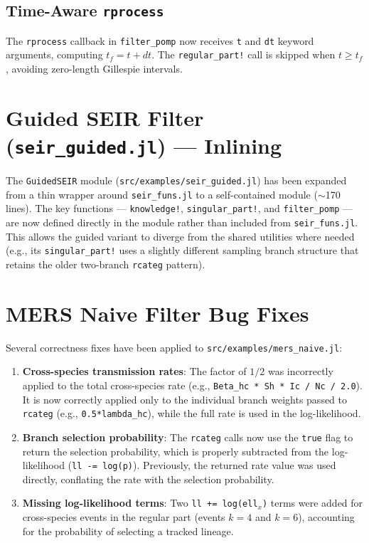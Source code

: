 \documentclass[11pt,letterpaper]{article}
\begin{document}
\subsection{Time-Aware \texttt{rprocess}}

The \texttt{rprocess} callback in \texttt{filter\_pomp} now receives
\texttt{t} and \texttt{dt} keyword arguments, computing
$t_f = t + dt$. The \texttt{regular\_part!} call is skipped when
$t \geq t_f$, avoiding zero-length Gillespie intervals.

\section{Guided SEIR Filter (\texttt{seir\_guided.jl}) --- Inlining}

The \texttt{GuidedSEIR} module (\texttt{src/examples/seir\_guided.jl})
has been expanded from a thin wrapper around \texttt{seir\_funs.jl} to
a self-contained module ($\sim$170 lines). The key functions ---
\texttt{knowledge!}, \texttt{singular\_part!}, and
\texttt{filter\_pomp} --- are now defined directly in the module
rather than included from \texttt{seir\_funs.jl}. This allows the
guided variant to diverge from the shared utilities where needed (e.g.,
its \texttt{singular\_part!} uses a slightly different sampling branch
structure that retains the older two-branch \texttt{rcateg} pattern).

\section{MERS Naive Filter Bug Fixes}

Several correctness fixes have been applied to
\texttt{src/examples/mers\_naive.jl}:

\begin{enumerate}
  \item \textbf{Cross-species transmission rates}: The factor of
        $1/2$ was incorrectly applied to the total cross-species rate
        (e.g., \texttt{Beta\_hc * Sh * Ic / Nc / 2.0}). It is now
        correctly applied only to the individual branch weights passed
        to \texttt{rcateg} (e.g., \texttt{0.5*lambda\_hc}), while the
        full rate is used in the log-likelihood.

  \item \textbf{Branch selection probability}: The \texttt{rcateg}
        calls now use the \texttt{true} flag to return the selection
        probability, which is properly subtracted from the
        log-likelihood (\texttt{ll -= log(p)}). Previously, the
        returned rate value was used directly, conflating the rate with
        the selection probability.

  \item \textbf{Missing log-likelihood terms}: Two
        \texttt{ll += log(ell$_x$)} terms were added for cross-species
        events in the regular part (events $k=4$ and $k=6$), accounting
        for the probability of selecting a tracked lineage.
\end{enumerate}
\end{document}
